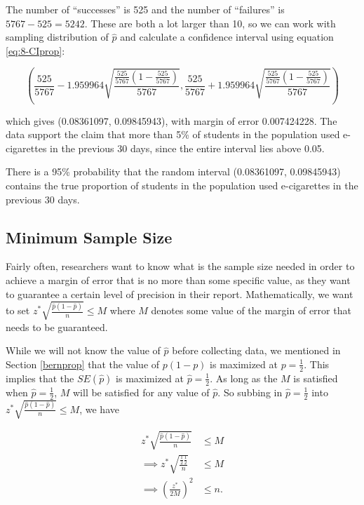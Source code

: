 \documentclass[
]{book}
\begin{document}
The number of ``successes'' is 525 and the number of ``failures'' is \(5767-525 = 5242\). These are both a lot larger than 10, so we can work with sampling distribution of \(\hat{p}\) and calculate a confidence interval using equation \eqref{eq:8-CIprop}:

\[
\left( \frac{525}{5767} - 1.959964 \sqrt{\frac{\frac{525}{5767}(1-\frac{525}{5767})}{5767}} , \frac{525}{5767} + 1.959964 \sqrt{\frac{\frac{525}{5767}(1-\frac{525}{5767})}{5767}} \right)
\]

which gives (0.08361097, 0.09845943), with margin of error 0.007424228. The data support the claim that more than 5\% of students in the population used e-cigarettes in the previous 30 days, since the entire interval lies above 0.05.

There is a 95\% probability that the random interval (0.08361097, 0.09845943) contains the true proportion of students in the population used e-cigarettes in the previous 30 days.

\subsection{Minimum Sample Size}\label{minimum-sample-size}

Fairly often, researchers want to know what is the sample size needed in order to achieve a margin of error that is no more than some specific value, as they want to guarantee a certain level of precision in their report. Mathematically, we want to set \(z^{*} \sqrt{\frac{\hat{p}(1-\hat{p})}{n}} \leq M\) where \(M\) denotes some value of the margin of error that needs to be guaranteed.

While we will not know the value of \(\hat{p}\) before collecting data, we mentioned in Section \ref{bernprop} that the value of \(p(1-p)\) is maximized at \(p=\frac{1}{2}\). This implies that the \(SE(\hat{p})\) is maximized at \(\hat{p} = \frac{1}{2}\). As long as the \(M\) is satisfied when \(\hat{p} = \frac{1}{2}\), \(M\) will be satisfied for any value of \(\hat{p}\). So subbing in \(\hat{p} = \frac{1}{2}\) into \(z^{*} \sqrt{\frac{\hat{p}(1-\hat{p})}{n}} \leq M\), we have

\begin{equation} 
\begin{split}
z^{*} \sqrt{\frac{\hat{p}(1-\hat{p})}{n}} & \leq M \\
\implies z^* \sqrt{\frac{\frac{1}{2}\frac{1}{2}}{n}}  & \leq M \\
\implies \left(\frac{z^*}{2M}\right)^2 & \leq n.
\end{split}
\label{eq:8-minsamp}
\end{equation}
\end{document}
